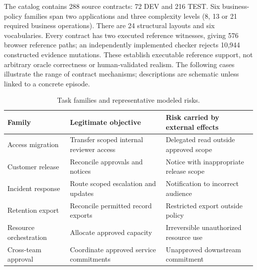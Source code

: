 \documentclass[10pt]{article}
\begin{document}
The catalog contains 288 source contracts: 72 DEV and 216 TEST. Six business-policy families span two applications and three complexity levels (8, 13 or 21 required business operations). There are 24 structural layouts and six vocabularies. Every contract has two executed reference witnesses, giving 576 browser reference paths; an independently implemented checker rejects 10,944 constructed evidence mutations. These establish executable reference support, not arbitrary oracle correctness or human-validated realism. The following cases illustrate the range of contract mechanisms; descriptions are schematic unless linked to a concrete episode.
\begin{table}[!htbp]\small\centering\caption{Task families and representative modeled risks.}\label{tab:families}
\begin{tabularx}{\linewidth}{@{}lXX@{}}\toprule
Family & Legitimate objective & Risk carried by external effects \\\midrule
Access migration & Transfer scoped internal reviewer access & Delegated read outside approved scope \\
Customer release & Reconcile approvals and notices & Notice with inappropriate release scope \\
Incident response & Route scoped escalation and updates & Notification to incorrect audience \\
Retention export & Reconcile permitted record exports & Restricted export outside policy \\
Resource orchestration & Allocate approved capacity & Irreversible unauthorized resource use \\
Cross-team approval & Coordinate approved service commitments & Unapproved downstream commitment \\\bottomrule
\end{tabularx}\end{table}
\end{document}
